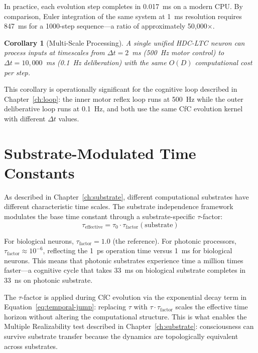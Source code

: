 \documentclass[12pt]{book}
\newtheorem{corollary}[theorem]{Corollary}
\begin{document}
In practice, each evolution step completes in 0.017~ms on a modern CPU. By comparison, Euler integration of the same system at 1~ms resolution requires 847~ms for a 1000-step sequence---a ratio of approximately 50,000$\times$.

\begin{corollary}[Multi-Scale Processing]
A single unified HDC-LTC neuron can process inputs at timescales from $\Delta t = 2$~ms (500~Hz motor control) to $\Delta t = 10{,}000$~ms (0.1~Hz deliberation) with the same $O(D)$ computational cost per step.
\end{corollary}

This corollary is operationally significant for the cognitive loop described in Chapter~\ref{ch:loop}: the inner motor reflex loop runs at 500~Hz while the outer deliberative loop runs at 0.1~Hz, and both use the same CfC evolution kernel with different $\Delta t$ values.

\section{Substrate-Modulated Time Constants}

As described in Chapter~\ref{ch:substrate}, different computational substrates have different characteristic time scales. The substrate independence framework modulates the base time constant through a substrate-specific $\tau$-factor:
\begin{equation}
\tau_{\text{effective}} = \tau_0 \cdot \tau_{\text{factor}}(\text{substrate})
\end{equation}

For biological neurons, $\tau_{\text{factor}} = 1.0$ (the reference). For photonic processors, $\tau_{\text{factor}} \approx 10^{-6}$, reflecting the 1~ps operation time versus 1~ms for biological neurons. This means that photonic substrates experience time a million times faster---a cognitive cycle that takes 33~ms on biological substrate completes in 33~ns on photonic substrate.

The $\tau$-factor is applied during CfC evolution via the exponential decay term in Equation~\ref{eq:temporal-jump}: replacing $\tau$ with $\tau \cdot \tau_{\text{factor}}$ scales the effective time horizon without altering the computational structure. This is what enables the Multiple Realizability test described in Chapter~\ref{ch:substrate}: consciousness can survive substrate transfer because the dynamics are topologically equivalent across substrates.
\end{document}
